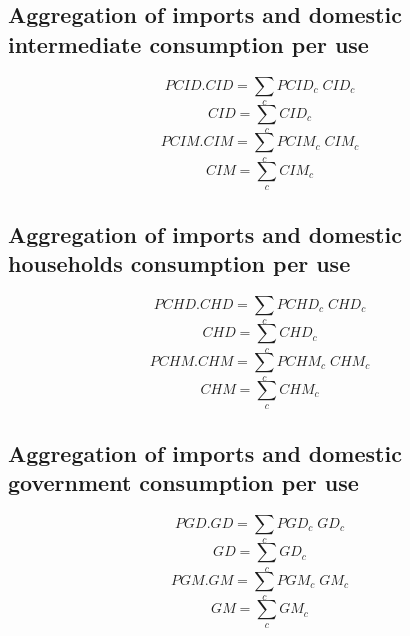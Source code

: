 \documentclass[12pt]{article}
\numberwithin{equation}{section}
\begin{document}
\subsection{Aggregation of imports and domestic intermediate consumption per use}



\begin{dmath}
PCID . CID = \sum_{c} PCID_{c} \; CID_{c}
\end{dmath}
\begin{dmath}
CID = \sum_{c} CID_{c}
\end{dmath}
\begin{dmath}
PCIM . CIM = \sum_{c} PCIM_{c} \; CIM_{c}
\end{dmath}
\begin{dmath}
CIM = \sum_{c} CIM_{c}
\end{dmath}



\subsection{Aggregation of imports and domestic households consumption per use}



\begin{dmath}
PCHD . CHD = \sum_{c} PCHD_{c} \; CHD_{c}
\end{dmath}
\begin{dmath}
CHD = \sum_{c} CHD_{c}
\end{dmath}
\begin{dmath}
PCHM . CHM = \sum_{c} PCHM_{c} \; CHM_{c}
\end{dmath}
\begin{dmath}
CHM = \sum_{c} CHM_{c}
\end{dmath}



\subsection{Aggregation of imports and domestic government consumption per use}



\begin{dmath}
PGD . GD = \sum_{c} PGD_{c} \; GD_{c}
\end{dmath}
\begin{dmath}
GD = \sum_{c} GD_{c}
\end{dmath}
\begin{dmath}
PGM . GM = \sum_{c} PGM_{c} \; GM_{c}
\end{dmath}
\begin{dmath}
GM = \sum_{c} GM_{c}
\end{dmath}
\end{document}
